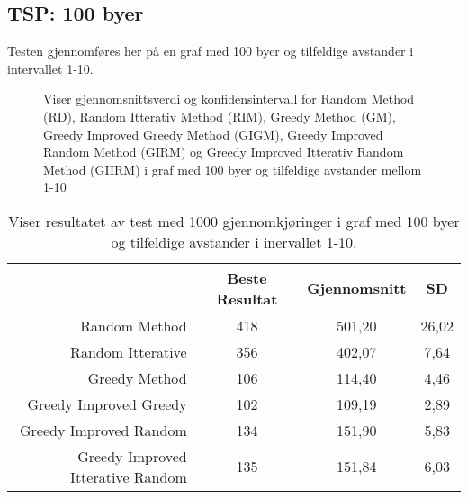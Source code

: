 \documentclass[12pt]{article}
\begin{document}
\subsection{TSP: 100 byer}
Testen gjennomføres her på en graf med 100 byer og tilfeldige avstander i intervallet 1-10.
\begin{figure}[h]
\centering
\caption{Viser gjennomsnittsverdi og konfidensintervall for Random Method (RD), Random Itterativ Method (RIM), Greedy Method (GM), Greedy Improved Greedy Method (GIGM), Greedy Improved Random Method (GIRM) og Greedy Improved Itterativ Random Method (GIIRM) i graf med 100 byer og tilfeldige avstander mellom 1-10}
\end{figure}

\begin{table}[h]
\begin{tabular}{ |r|c|c|c|} 
\hline
  & Beste Resultat & Gjennomsnitt & SD\\ 
 \hline
 Random Method & 418 & 501,20 & 26,02\\ 
 \hline
 Random Itterative & 356 & 402,07 & 7,64 \\ 
  \hline
 Greedy Method & 106 & 114,40 & 4,46 \\ 
 \hline
 Greedy Improved Greedy& 102 & 109,19 & 2,89 \\ 
 \hline
  Greedy Improved Random& 134 & 151,90 & 5,83 \\ 
   \hline
     Greedy Improved Itterative Random& 135 & 151,84 & 6,03\\ 
 \hline

 \end{tabular}
\caption{Viser resultatet av test med 1000 gjennomkjøringer i graf med 100 byer og tilfeldige avstander i inervallet 1-10.}
\end{table}
\end{document}
